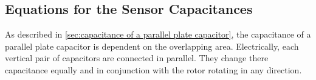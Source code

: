     \subsection{Equations for the Sensor Capacitances}\label{sec:preparation_task_5}
        As described in \cref{sec:capacitance of a parallel plate capacitor}, the capacitance of a parallel plate capacitor
        is dependent on the overlapping area. Electrically, each vertical pair of capacitors are connected in parallel. They
        change there capacitance equally and in conjunction with the rotor rotating in any direction.\par
